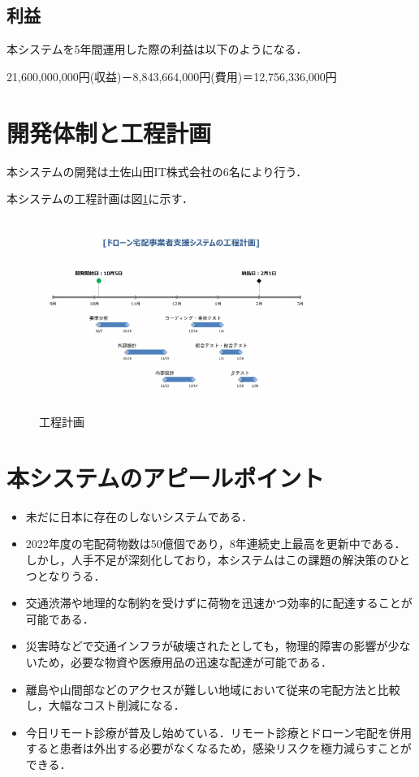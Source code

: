 \documentclass[a4paper, titlepage]{jsarticle}
\begin{document}
\subsection{利益}
本システムを5年間運用した際の利益は以下のようになる．
\begin{center}
  21,600,000,000円(収益)－8,843,664,000円(費用)＝12,756,336,000円
\end{center}

\section{開発体制と工程計画}
本システムの開発は土佐山田IT株式会社の6名により行う．

本システムの工程計画は図\ref{fig:schedule}に示す．
\begin{figure}[H]
  \centering
  \includegraphics[width=0.8\textwidth]{schedule.pdf}
  \caption{工程計画}
  \label{fig:schedule}
\end{figure}

\section{本システムのアピールポイント}
\begin{itemize}
  \item 未だに日本に存在のしないシステムである．
  \item 2022年度の宅配荷物数は50億個であり，8年連続史上最高を更新中である．しかし，人手不足が深刻化しており，本システムはこの課題の解決策のひとつとなりうる．
  \item 交通渋滞や地理的な制約を受けずに荷物を迅速かつ効率的に配達することが可能である．
  \item 災害時などで交通インフラが破壊されたとしても，物理的障害の影響が少ないため，必要な物資や医療用品の迅速な配達が可能である．
  \item 離島や山間部などのアクセスが難しい地域において従来の宅配方法と比較し，大幅なコスト削減になる．
  \item 今日リモート診療が普及し始めている．リモート診療とドローン宅配を併用すると患者は外出する必要がなくなるため，感染リスクを極力減らすことができる．
\end{itemize}
\end{document}

